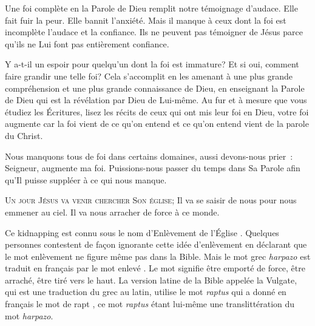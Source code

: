 \vspace{-0.5em}
\vspace{-0.5em}

Une foi complète en la Parole de Dieu remplit notre témoignage d'audace.
 Elle fait fuir la peur. Elle bannit l'anxiété. Mais il manque à ceux
 dont la foi est incomplète l'audace et la confiance.
 Ils ne peuvent pas témoigner de Jésus parce qu'ils ne Lui font pas
 entièrement confiance.

Y a-t-il  un espoir pour quelqu'un dont la foi est immature?
 Et si oui, comment faire grandir une telle foi? Cela s'accomplit
 en les amenant à une plus grande compréhension et une plus grande
 connaissance de Dieu, en enseignant la Parole de Dieu qui est la révélation
 par Dieu de Lui-même. Au fur et à mesure que vous étudiez les Écritures,
 lisez les récits de ceux qui ont mis leur foi en Dieu, votre foi augmente
 \ocadr car la foi vient de ce qu'on entend et ce qu'on entend vient
 de la parole du Christ.

Nous manquons tous de foi dans certains domaines, aussi devons-nous prier~: 
 \og Seigneur, augmente ma foi. \fg{}
 Puissions-nous passer du temps dans Sa Parole afin qu'Il puisse
 suppléer à ce qui nous manque.

\dvrule






\lettrine{U}{n jour Jésus va venir chercher Son église;}
 Il va se saisir de nous pour nous emmener au ciel.
 Il va nous arracher de force à ce monde.

Ce \og kidnapping \fg{} est connu sous le nom \og d'Enlèvement de l'Église \fg{}.
 Quelques personnes contestent de façon ignorante cette idée d'enlèvement
 en déclarant que le mot \og enlèvement \fg{} ne figure même pas dans la Bible.
 Mais le mot grec \emph{harpazo} est traduit en français
 par le mot \og enlevé \fg{}. Le mot signifie \og être emporté de force,
 être arraché, être tiré vers le haut. \fg{}
 La version latine de la Bible appelée la Vulgate, qui est une traduction
 du grec au latin,  utilise
 le mot \emph{raptus} qui a donné en français le mot de \og rapt \fg{},
 ce mot \emph{raptus} étant lui-même une translittération du mot \emph{harpazo}. 

